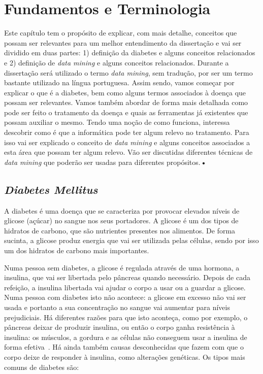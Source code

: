 \chapter{Fundamentos e Terminologia}\label{chap:concepts}

Este capítulo tem o propósito de explicar, com mais detalhe, conceitos que possam ser relevantes para um melhor entendimento da dissertação e vai ser dividido em duas partes: 1) definição da diabetes e alguns conceitos relacionados e 2) definição de \textit{data mining} e alguns conceitos relacionados. Durante a dissertação será utilizado o termo \textit{data mining}, sem tradução, por ser um termo bastante utilizado na língua portuguesa.
Assim sendo, vamos começar por explicar o que é a diabetes, bem como alguns termos associados à doença que possam ser relevantes. Vamos também abordar de forma mais detalhada como pode ser feito o tratamento da doença e quais as ferramentas já existentes que possam auxiliar o mesmo. 
Tendo uma noção de como funciona, interessa descobrir como é que a informática pode ter algum relevo no tratamento. Para isso vai ser explicado o conceito de \textit{data mining} e alguns conceitos associados a esta área que possam ter algum relevo. Vão ser discutidas diferentes técnicas de \textit{data mining} que poderão ser usadas para diferentes propósitos.\textbf{•}

\section{\textit{Diabetes Mellitus}}

A diabetes é uma doença que se caracteriza por provocar elevados níveis de glicose (açúcar) no sangue nos seus portadores. A glicose é um dos tipos de hidratos de carbono, que são nutrientes presentes nos alimentos. De forma sucinta, a glicose produz energia que vai ser utilizada pelas células, sendo por isso um dos hidratos de carbono mais importantes. 

Numa pessoa sem diabetes, a glicose é regulada através de uma hormona, a insulina, que vai ser libertada pelo pâncreas quando necessário. Depois de cada refeição, a insulina libertada vai ajudar o corpo a usar ou a guardar a glicose. 
Numa pessoa com diabetes isto não acontece: a glicose em excesso não vai ser usada e portanto a sua concentração no sangue vai aumentar para níveis prejudiciais. Há diferentes razões para que isto aconteça, como por exemplo, o pâncreas deixar de produzir insulina, ou então o corpo ganha resistência à insulina: os músculos, a gordura e as células não conseguem usar a insulina de forma efetiva~\cite{spd}. Há ainda também causas desconhecidas que fazem com que o corpo deixe de responder à insulina, como alterações genéticas. Os tipos mais comuns de diabetes são:


